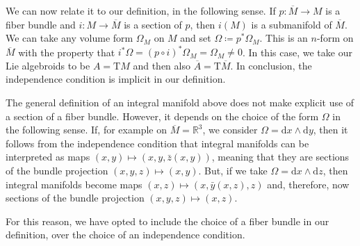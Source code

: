 \documentclass[11pt]{article}
\theoremstyle{plain}
\theoremstyle{definition}
\begin{document}
We can now relate it to our definition, in the following sense. If $p\colon \overline M \to M$ is a fiber bundle and $i\colon M \to \overline M$ is a section of $p$, then $i(M)$ is a submanifold of $\overline{M}$. We can take any volume form $\Omega_M$ on $M$ and set $\Omega\coloneqq p^{\ast} \Omega_M$. This is an $n$-form on $\overline M$ with the property that $i^{\ast} \Omega = (p\circ i)^{\ast} \Omega_M =\Omega_M \neq 0$. In this case, we take our Lie algebroids to be $A=\mathrm{T}M$ and then also $\overline{A}=\mathrm{T} \overline M$. In conclusion, the independence condition is implicit in our definition.  

The general definition of an integral manifold above does not make explicit use of a section of a fiber bundle. However, it depends on the choice of the form $\Omega$ in the following sense. If, for example on $\overline M = {\mathbb R}^3$, we consider $\Omega = \mathrm{d}x\wedge \mathrm{d}y$, then it follows from the independence condition that integral manifolds can be interpreted as maps $(x,y) \mapsto (x,y, {\bar z}(x,y))$, meaning that they are sections of the bundle projection $(x,y,z)\mapsto (x,y)$. But, if we take $\Omega = \mathrm{d}x\wedge \mathrm{d}z$, then integral manifolds become maps $(x,z) \mapsto (x,{\bar y}(x,z), z)$ and, therefore, now sections of the bundle projection $(x,y,z)\mapsto (x,z)$.

For this reason, we have opted to include the choice of a fiber bundle in our definition, over the choice of an independence condition.
 


 








\end{document}
